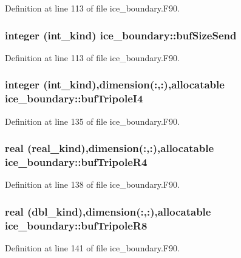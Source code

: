 Definition at line 113 of file ice\_\-boundary.F90.\hypertarget{namespaceice__boundary_aa836a7146cb8129f59f4a457b5100c2c}{
\subsubsection[{bufSizeSend}]{\setlength{\rightskip}{0pt plus 5cm}integer (int\_\-kind) {\bf ice\_\-boundary::bufSizeSend}}}
\label{namespaceice__boundary_aa836a7146cb8129f59f4a457b5100c2c}


Definition at line 113 of file ice\_\-boundary.F90.\hypertarget{namespaceice__boundary_a3bcbb0d2bf24f90a72bbbedfd53ec6bd}{
\subsubsection[{bufTripoleI4}]{\setlength{\rightskip}{0pt plus 5cm}integer (int\_\-kind),dimension(:,:),allocatable {\bf ice\_\-boundary::bufTripoleI4}}}
\label{namespaceice__boundary_a3bcbb0d2bf24f90a72bbbedfd53ec6bd}


Definition at line 135 of file ice\_\-boundary.F90.\hypertarget{namespaceice__boundary_a8d42883469648c0eef77bb2f2c830853}{
\subsubsection[{bufTripoleR4}]{\setlength{\rightskip}{0pt plus 5cm}real (real\_\-kind),dimension(:,:),allocatable {\bf ice\_\-boundary::bufTripoleR4}}}
\label{namespaceice__boundary_a8d42883469648c0eef77bb2f2c830853}


Definition at line 138 of file ice\_\-boundary.F90.\hypertarget{namespaceice__boundary_a0cf3692aba462080bcd506c8e2b56b21}{
\subsubsection[{bufTripoleR8}]{\setlength{\rightskip}{0pt plus 5cm}real (dbl\_\-kind),dimension(:,:),allocatable {\bf ice\_\-boundary::bufTripoleR8}}}
\label{namespaceice__boundary_a0cf3692aba462080bcd506c8e2b56b21}


Definition at line 141 of file ice\_\-boundary.F90.